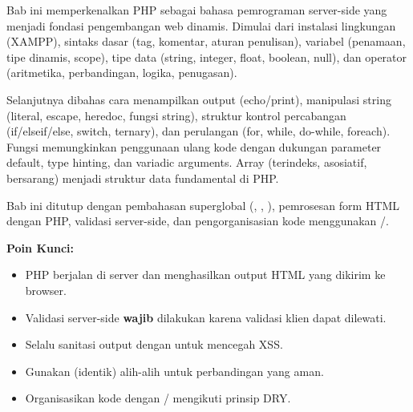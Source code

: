\documentclass[../main.tex]{subfiles}
\begin{document}
\begin{rangkuman}
Bab ini memperkenalkan PHP sebagai bahasa pemrograman server-side yang menjadi fondasi pengembangan web dinamis. Dimulai dari instalasi lingkungan (XAMPP), sintaks dasar (tag, komentar, aturan penulisan), variabel (penamaan, tipe dinamis, scope), tipe data (string, integer, float, boolean, null), dan operator (aritmetika, perbandingan, logika, penugasan).

Selanjutnya dibahas cara menampilkan output (echo/print), manipulasi string (literal, escape, heredoc, fungsi string), struktur kontrol percabangan (if/elseif/else, switch, ternary), dan perulangan (for, while, do-while, foreach). Fungsi memungkinkan penggunaan ulang kode dengan dukungan parameter default, type hinting, dan variadic arguments. Array (terindeks, asosiatif, bersarang) menjadi struktur data fundamental di PHP.

Bab ini ditutup dengan pembahasan superglobal (, , ), pemrosesan form HTML dengan PHP, validasi server-side, dan pengorganisasian kode menggunakan /.

\textbf{Poin Kunci:}
\begin{itemize}
  \item PHP berjalan di server dan menghasilkan output HTML yang dikirim ke browser.
  \item Validasi server-side \textbf{wajib} dilakukan karena validasi klien dapat dilewati.
  \item Selalu sanitasi output dengan  untuk mencegah XSS.
  \item Gunakan \code{===} (identik) alih-alih \code{==} untuk perbandingan yang aman.
  \item Organisasikan kode dengan / mengikuti prinsip DRY.
\end{itemize}
\end{rangkuman}

\ifSubfilesClassLoaded{
  \renewcommand{\bibname}{Daftar Pustaka}
  
  
}{}
\end{document}

